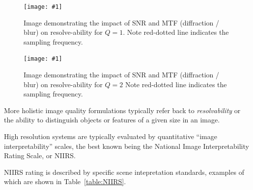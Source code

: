 \documentclass[10pt,journal]{IEEEtran}  %
\newcommand{\includefigure}[3]
{
  \begin{figure}[h!]
  \centering
  \texttt{[image: \#1]}
  \caption[]{#3}
  \label{#2}
  \end{figure}
}
\begin{document}
\includefigure{figures/SNR_mtf_Q1.pdf}{fig:snr_mtf_q1}{Image demonstrating the impact of SNR and MTF (diffraction / blur) on resolve-ability for $Q=1$.  Note red-dotted line indicates the sampling frequency.}

\includefigure{figures/SNR_mtf_Q2.pdf}{fig:snr_mtf_q2}{Image demonstrating the impact of SNR and MTF (diffraction / blur) on resolve-ability for $Q=2$  Note red-dotted line indicates the sampling frequency.}

More holistic image quality formulations typically refer back to \emph{resolvability} or the ability to distinguish objects or features of a given size in an image.

High resolution systems are typically evaluated by quantitative ``image interpretability'' scales, the best known being the National Image Interpretability Rating Scale, or NIIRS.

NIIRS rating is described by specific scene intepretation standards, examples of which are shown in Table~\ref{table:NIIRS}\cite{niirs}.

\begin{table}[h!t]
\centering
\caption{NIIRS definitions}
\label{table:NIIRS}
\end{table}
\end{document}
